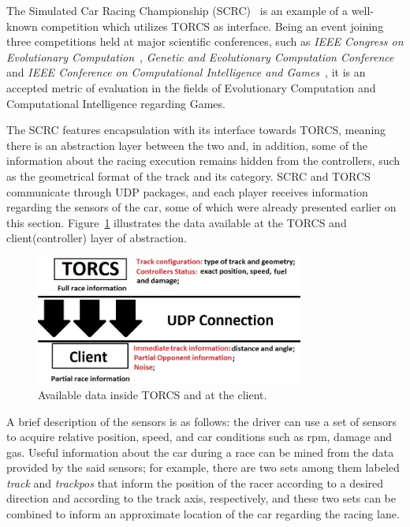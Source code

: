 	The Simulated Car Racing Championship (SCRC)~\cite{SCR} is an example of a well-known competition which utilizes
	TORCS as interface. Being an event joining three competitions held at major scientific conferences, such as
	\emph{IEEE Congress on Evolutionary Computation}~\cite{CEC}, \emph{Genetic and Evolutionary Computation
	Conference}~\cite{GECCO} and \emph{IEEE Conference on Computational Intelligence and Games}~\cite{CIG}, it is
	an accepted	metric of evaluation in the fields of Evolutionary Computation and Computational Intelligence
	regarding Games.
	
	The SCRC features encapsulation with its interface towards TORCS, meaning there is an abstraction layer between
	the two and, in addition, some of the information about the racing execution remains hidden from the controllers,
	such as the geometrical format of the track and its category. SCRC and TORCS communicate through UDP packages,
	and each player receives information regarding the sensors of the car, some of which were already presented
	earlier on this section. Figure~\ref{Fig:1} illustrates the data available at the TORCS and client(controller) layer 
	of abstraction. 

   	\begin{figure}[h]
	\centering
	\includegraphics[width=250pt]{Figure1}
	\caption{\label{Fig:1}Available data inside TORCS and at the client.}
	\end{figure}
	
	A brief description of the sensors is as follows: the driver can use a set of sensors to acquire relative
	position, speed, and car conditions such as rpm, damage and gas. Useful information about the car during a race
	can be mined from the data provided by the said sensors; for example, there are two sets among them labeled
	\emph{track} and \emph{trackpos} that inform the position of the racer according to a desired direction and
	according to the track axis, respectively, and these two sets can be combined to inform an approximate location
	of the car regarding the racing lane.
	
